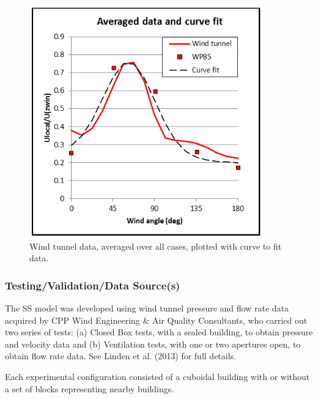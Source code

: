 \begin{figure}[hbtp] %
\centering
\includegraphics[width=0.9\textwidth, height=0.9\textheight, keepaspectratio=true]{media/ss-figure6.png}
\caption{Wind tunnel data, averaged over all cases, plotted with curve to fit data. \protect \label{fig:ss-wind-tunnel-data}}
\end{figure}

\subsubsection{Testing/Validation/Data Source(s)}
The SS model was developed using wind tunnel pressure and flow rate data acquired by CPP Wind Engineering \& Air Quality Consultants, who carried out two series of tests: (a) Closed Box tests, with a sealed building, to obtain pressure and velocity data and (b) Ventilation tests, with one or two apertures open, to obtain flow rate data. See Linden et al. (2013) for full details.

Each experimental configuration consisted of a cuboidal building with or without a set of blocks representing nearby buildings. 

